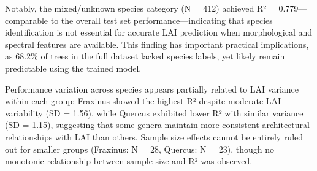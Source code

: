Notably, the mixed/unknown species category (N = 412) achieved R² = 0.779—comparable to the overall test set performance—indicating that species identification is not essential for accurate LAI prediction when morphological and spectral features are available. This finding has important practical implications, as 68.2\% of trees in the full dataset lacked species labels, yet likely remain predictable using the trained model.

Performance variation across species appears partially related to LAI variance within each group: Fraxinus showed the highest R² despite moderate LAI variability (SD = 1.56), while Quercus exhibited lower R² with similar variance (SD = 1.15), suggesting that some genera maintain more consistent architectural relationships with LAI than others. Sample size effects cannot be entirely ruled out for smaller groups (Fraxinus: N = 28, Quercus: N = 23), though no monotonic relationship between sample size and R² was observed.

\clearpage
